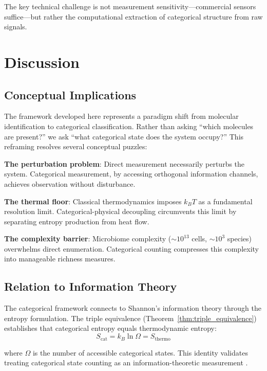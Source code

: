 \documentclass[twocolumn,10pt]{article}
\begin{document}
The key technical challenge is not measurement sensitivity---commercial sensors suffice---but rather the computational extraction of categorical structure from raw signals.

\section{Discussion}

\subsection{Conceptual Implications}

The framework developed here represents a paradigm shift from molecular identification to categorical classification. Rather than asking ``which molecules are present?'' we ask ``what categorical state does the system occupy?'' This reframing resolves several conceptual puzzles:

\textbf{The perturbation problem}: Direct measurement necessarily perturbs the system. Categorical measurement, by accessing orthogonal information channels, achieves observation without disturbance.

\textbf{The thermal floor}: Classical thermodynamics imposes $k_B T$ as a fundamental resolution limit. Categorical-physical decoupling circumvents this limit by separating entropy production from heat flow.

\textbf{The complexity barrier}: Microbiome complexity ($\sim 10^{13}$ cells, $\sim 10^3$ species) overwhelms direct enumeration. Categorical counting compresses this complexity into manageable richness measures.

\subsection{Relation to Information Theory}

The categorical framework connects to Shannon's information theory \cite{shannon1948} through the entropy formulation. The triple equivalence (Theorem~\ref{thm:triple_equivalence}) establishes that categorical entropy equals thermodynamic entropy:
\begin{equation}
    S_{\text{cat}} = k_B \ln \Omega = S_{\text{thermo}}
\end{equation}

where $\Omega$ is the number of accessible categorical states. This identity validates treating categorical state counting as an information-theoretic measurement \cite{jaynes1957}.
\end{document}
